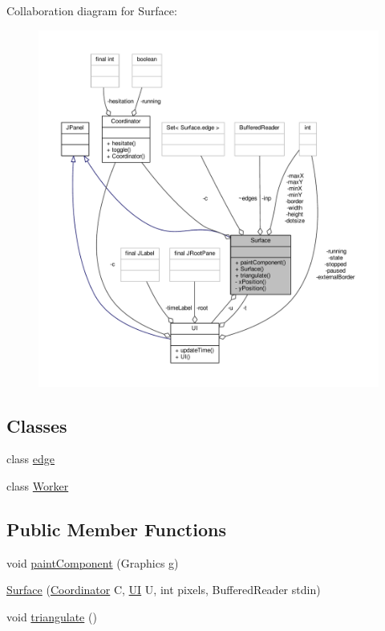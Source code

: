 Collaboration diagram for Surface\-:
\nopagebreak
\begin{figure}[H]
\begin{center}
\leavevmode
\includegraphics[width=350pt]{classSurface__coll__graph}
\end{center}
\end{figure}
\subsection*{Classes}
\begin{DoxyCompactItemize}
\item 
class \hyperlink{classSurface_1_1edge}{edge}
\item 
class \hyperlink{classSurface_1_1Worker}{Worker}
\end{DoxyCompactItemize}
\subsection*{Public Member Functions}
\begin{DoxyCompactItemize}
\item 
void \hyperlink{classSurface_adcda395ddcb459d3e5d0815c7eca902d}{paint\-Component} (Graphics g)
\item 
\hyperlink{classSurface_a779253a13324a9c8d9e9b8e54dfc5f3c}{Surface} (\hyperlink{classCoordinator}{Coordinator} C, \hyperlink{classUI}{U\-I} U, int pixels, Buffered\-Reader stdin)
\item 
void \hyperlink{classSurface_a40c36f263f4055a7cca51e9b9ac39b51}{triangulate} ()
\end{DoxyCompactItemize}
